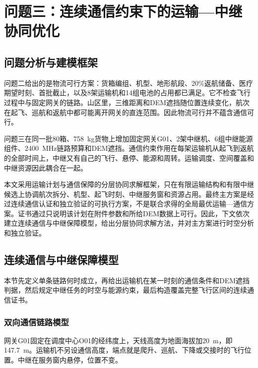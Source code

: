 \section{问题三：连续通信约束下的运输—中继协同优化}

\subsection{问题分析与建模框架}

问题二给出的是物流可行方案：货箱编组、机型、地形航段、20\%返航储备、医疗期望时刻、首批截止，以及8架运输机和14组电池的占用都已满足。它不检查飞行过程中与固定网关的链路。山区里，三维距离和DEM遮挡随位置连续变化，航次在起飞、巡航和返航中都可能离开网关的直连范围。因此物流可行并不蕴含通信可行。

问题三在同一批80箱、758~kg货物上增加固定网关G01、2架中继机、6组中继能源组件、2400~MHz链路预算和DEM遮挡。通信约束作用在每架运输机从起飞到返航的全部时间上，中继又有自己的飞行、悬停、能源和周转。运输调度、空间覆盖和中继资源因此耦合在一起。

本文采用运输计划与通信保障的分层协同求解框架，只在有限运输结构和有限中继候选上协调航次拆分、机型、起飞时刻、中继服务窗和资源占用。最终主方案是经过连续通信认证和独立验证的可执行方案，不是联合求得的全局最优运输—通信方案。证书通过只说明该计划在附件参数和所给DEM数据上可行。因此，下文依次建立连续通信与中继保障模型，给出分层协同求解方法，并对主方案进行时空分析和独立验证。

\subsection{连续通信与中继保障模型}
\label{sec:q3model}

本节先定义单条链路何时成立，再给出运输机在某一时刻的通信条件和DEM遮挡判据，然后规定中继任务的时空与能源约束，最后构造覆盖完整飞行区间的连续通信证书。

\subsubsection{双向通信链路模型}

网关G01固定在调度中心O01的经纬度上，天线高度为地面海拔加20~m，即147.7~m。运输机不另设通信高度，端点就是爬升、巡航、下降或交接时的飞行位置。中继在服务窗内悬停，位置不变。

